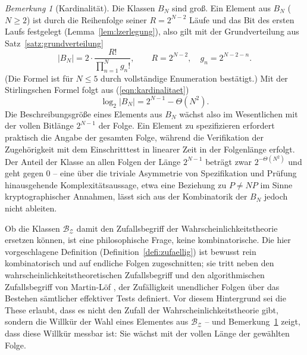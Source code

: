 \documentclass[11pt,a4paper]{scrartcl}
\theoremstyle{plain}
\theoremstyle{definition}
\theoremstyle{remark}
\newtheorem{bem}[satz]{Bemerkung}
\begin{document}
\begin{bem}[Kardinalität]\label{bem:kardinalitaet}
Die Klassen $B_N$ sind groß. Ein Element aus $B_N$ ($N\geq 2$) ist
durch die Reihenfolge seiner $R=2^{N-2}$ Läufe und das Bit des ersten
Laufs festgelegt (Lemma~\ref{lem:lzerlegung}), also gilt mit der
Grundverteilung aus Satz~\ref{satz:grundverteilung}
\begin{equation}\label{eqn:kardinalitaet}
  \left|B_N\right|
  = 2\cdot\frac{R!}{\prod_{n=1}^{N} g_n!},
  \qquad R=2^{N-2},\quad g_n=2^{N-2-n}.
\end{equation}
(Die Formel ist für $N\leq 5$ durch vollständige Enumeration
bestätigt.) Mit der Stirlingschen Formel folgt aus
(\ref{eqn:kardinalitaet})
\begin{equation}\label{eqn:kardinalitaetasymptotik}
  \log_2\left|B_N\right| = 2^{N-1}-\Theta\!\left(N^2\right).
\end{equation}
Die Beschreibungsgröße eines Elements aus $B_N$ wächst also im
Wesentlichen mit der vollen Bitlänge $2^{N-1}$ der Folge. Ein Element zu
spezifizieren erfordert praktisch die Angabe der gesamten Folge,
während die Verifikation der Zugehörigkeit mit dem Einschritttest in
linearer Zeit in der Folgenlänge erfolgt. Der Anteil der Klasse an
allen Folgen der Länge $2^{N-1}$ beträgt zwar $2^{-\Theta(N^2)}$ und
geht gegen $0$ -- eine über die triviale Asymmetrie von Spezifikation
und Prüfung hinausgehende Komplexitätsaussage, etwa eine Beziehung zu
$P\neq NP$ im Sinne kryptographischer Annahmen, lässt sich aus der
Kombinatorik der $B_N$ jedoch nicht ableiten.
\end{bem}

\noindent Ob die Klassen $\mathcal{B_Z}$ damit den Zufallsbegriff der
Wahrscheinlichkeitstheorie ersetzen können, ist eine philosophische
Frage, keine kombinatorische. Die hier vorgeschlagene Definition
(Definition~\ref{defi:zufaellig}) ist bewusst rein kombinatorisch und
auf endliche Folgen zugeschnitten; sie tritt neben den
wahrscheinlichkeitstheoretischen Zufallsbegriff
\cite{kolmogoroff1933} und den algorithmischen Zufallsbegriff von
Martin-Löf \cite{martinloef1966}, der Zufälligkeit unendlicher Folgen
über das Bestehen sämtlicher effektiver Tests definiert. Vor diesem
Hintergrund sei die These erlaubt, dass es nicht den Zufall der
Wahrscheinlichkeitstheorie gibt, sondern die Willkür der Wahl eines
Elementes aus $\mathcal{B_Z}$ -- und
Bemerkung~\ref{bem:kardinalitaet} zeigt, dass diese Willkür messbar
ist: Sie wächst mit der vollen Länge der gewählten Folge.

\end{document}

